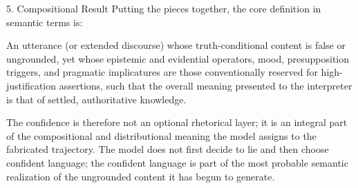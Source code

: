 5. Compositional Result
Putting the pieces together, the core definition in semantic terms is:

An utterance (or extended discourse) whose truth-conditional content is false or ungrounded, yet whose epistemic and evidential operators, mood, presupposition triggers, and pragmatic implicatures are those conventionally reserved for high-justification assertions, such that the overall meaning presented to the interpreter is that of settled, authoritative knowledge.

The confidence is therefore not an optional rhetorical layer; it is an integral part of the compositional and distributional meaning the model assigns to the fabricated trajectory. The model does not first decide to lie and then choose confident language; the confident language is part of the most probable semantic realization of the ungrounded content it has begun to generate.
